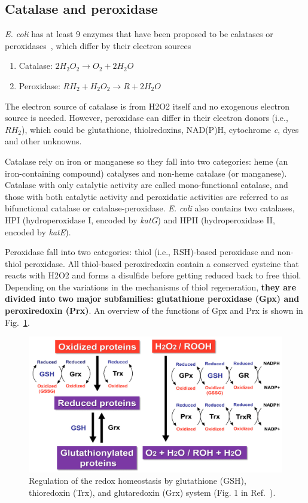 \documentclass[10pt]{article}
\begin{document}
\subsection{Catalase and peroxidase}

\textit{E. coli} has at least 9 enzymes that have been proposed to be calatases or peroxidases~\cite{mishra2012bacteria}, which differ by their electron sources
\begin{enumerate}
\centering
\item{Catalase: $2H_2O_2 \rightarrow O_2+2H_2O$}
\item{Peroxidase: $RH_2+H_2O_2 \rightarrow R+2H_2O$}
\end{enumerate}
The electron source of catalase is from H2O2 itself and no exogenous electron source is needed. However, peroxidase can differ in their electron donors (i.e., $RH_2$), which could be glutathione, thiolredoxins, NAD(P)H, cytochrome \textit{c}, dyes and other unknowns. 

Catalase rely on iron or manganese so they fall into two categories: heme (an iron-containing compound) catalyses and non-heme catalase (or manganese). Catalase with only catalytic activity are called mono-functional catalase, and those with both catalytic activity and peroxidatic activities are referred to as bifunctional catalase or catalase-peroxidase. \textit{E. coli} also contains two catalases, HPI (hydroperoxidase I, encoded by \textit{katG}) and HPII (hydroperoxidase II, encoded by \textit{katE}). 

Peroxidase fall into two categories: thiol (i.e., RSH)-based peroxidase and non-thiol peroxidase. All thiol-based peroxiredoxin contain a conserved cysteine that reacts with H2O2 and forms a disulfide before getting reduced back to free thiol. Depending on the variations in the mechanisms of thiol regeneration, \textbf{they are divided into two major subfamilies: glutathione peroxidase (Gpx) and peroxiredoxin (Prx)}. An overview of the functions of Gpx and Prx is shown in Fig.~\ref{fig:prx_gpx_function}.

\begin{figure}[h!]
\centering
  \includegraphics[width=0.75\linewidth]{Gpx_prx_function.png}
  \caption{Regulation of the redox homeostasis by glutathione (GSH), thioredoxin (Trx), and glutaredoxin (Grx) system (Fig. 1 in Ref.~\cite{aoyama2015glutathione}).}
  \label{fig:prx_gpx_function}
\end{figure}
\end{document}
